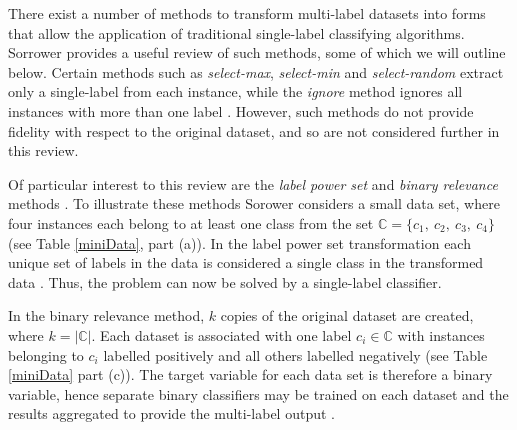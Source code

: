 \documentclass[Dissertation.tex]{subfiles}
\begin{document}
There exist a number of methods to transform multi-label datasets into forms that allow the application of traditional single-label classifying algorithms. Sorrower \cite{sorowerLiteratureSurveyAlgorithms2018} provides a useful review of such methods, some of which we will outline below. Certain methods such as \textit{select-max}, \textit{select-min} and \textit{select-random} extract only a single-label from each instance, while the \textit{ignore} method ignores all instances with more than one label \cite{sorowerLiteratureSurveyAlgorithms2018}. However, such methods do not provide fidelity with respect to the original dataset, and so are not considered further in this review. 

Of particular interest to this review are the \textit{label power set} and \textit{binary relevance} methods \cite{sorowerLiteratureSurveyAlgorithms2018}. To illustrate these methods Sorower \cite{sorowerLiteratureSurveyAlgorithms2018} considers a small data set, where four instances each belong to at least one class from the set $\mathbb{C} = \{c_1, \ c_2, \ c_3, \ c_4\}$ (see Table \ref{miniData}, part (a)).  In the label power set transformation each unique set of labels in the data is considered a single class in the transformed data \cite{sorowerLiteratureSurveyAlgorithms2018}. Thus, the problem can now be solved by a single-label classifier.

In the binary relevance method, $ k $ copies of the original dataset are created, where $ k = |\mathbb{C}| $. Each dataset is associated with one label $c_i \in \mathbb{C}$ with instances belonging to $ c_i $ labelled positively and all others labelled negatively (see Table \ref{miniData} part (c)). The target variable for each data set is therefore a binary variable, hence separate binary classifiers may be trained on each dataset and the results aggregated to provide the multi-label output \cite{sorowerLiteratureSurveyAlgorithms2018}.	

 
		
\end{document}
